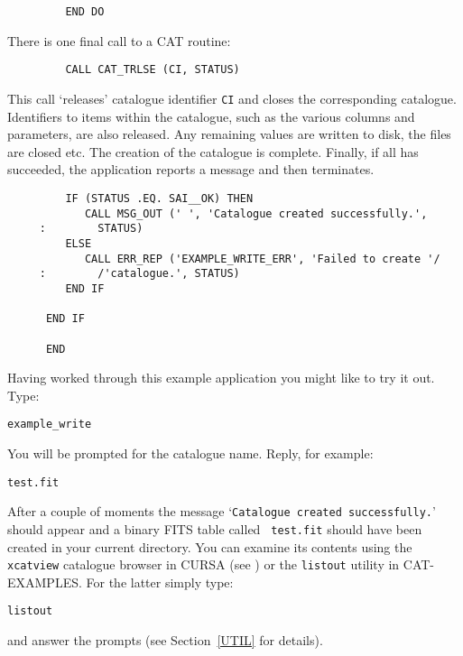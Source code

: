 \begin{verbatim}
         END DO
\end{verbatim}

There is one final call to a CAT routine:

\begin{verbatim}
         CALL CAT_TRLSE (CI, STATUS)
\end{verbatim}

This call `releases' catalogue identifier {\tt CI} and closes the
corresponding catalogue. Identifiers to items within the catalogue, such
as the various columns and parameters, are also released. Any remaining
values are written to disk, the files are closed etc. The creation of
the catalogue is complete. Finally, if all has succeeded, the
application reports a message and then terminates.

\begin{verbatim}
         IF (STATUS .EQ. SAI__OK) THEN
            CALL MSG_OUT (' ', 'Catalogue created successfully.',
     :        STATUS)
         ELSE
            CALL ERR_REP ('EXAMPLE_WRITE_ERR', 'Failed to create '/
     :        /'catalogue.', STATUS)
         END IF

      END IF

      END
\end{verbatim}

Having worked through this example application you might like to try
it out. Type:

\begin{verbatim}
example_write
\end{verbatim}

You will be prompted for the catalogue name. Reply, for example:

\begin{verbatim}
test.fit
\end{verbatim}

After a couple of moments the message `{\tt Catalogue created
successfully.}' should appear and a binary FITS table called {\tt
test.fit} should have been created in your current directory. You can
examine its contents using the {\tt xcatview} catalogue browser in
CURSA (see \cite{SUN190}) or the {\tt listout}
utility in CAT-EXAMPLES.  For the latter simply type:

\begin{verbatim}
listout
\end{verbatim}

and answer the prompts (see Section~\ref{UTIL} for details).

